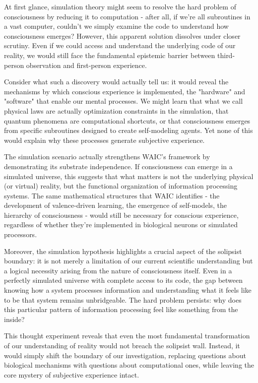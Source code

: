 At first glance, simulation theory might seem to resolve the hard problem of consciousness by reducing it to computation - after all, if we're all subroutines in a vast computer, couldn't we simply examine the code to understand how consciousness emerges? However, this apparent solution dissolves under closer scrutiny. Even if we could access and understand the underlying code of our reality, we would still face the fundamental epistemic barrier between third-person observation and first-person experience.

Consider what such a discovery would actually tell us: it would reveal the mechanisms by which conscious experience is implemented, the "hardware" and "software" that enable our mental processes. We might learn that what we call physical laws are actually optimization constraints in the simulation, that quantum phenomena are computational shortcuts, or that consciousness emerges from specific subroutines designed to create self-modeling agents. Yet none of this would explain why these processes generate subjective experience.

The simulation scenario actually strengthens WAIC's framework by demonstrating its substrate independence. If consciousness can emerge in a simulated universe, this suggests that what matters is not the underlying physical (or virtual) reality, but the functional organization of information processing systems. The same mathematical structures that WAIC identifies - the development of valence-driven learning, the emergence of self-models, the hierarchy of consciousness - would still be necessary for conscious experience, regardless of whether they're implemented in biological neurons or simulated processors.

Moreover, the simulation hypothesis highlights a crucial aspect of the solipsist boundary: it is not merely a limitation of our current scientific understanding but a logical necessity arising from the nature of consciousness itself. Even in a perfectly simulated universe with complete access to its code, the gap between knowing how a system processes information and understanding what it feels like to be that system remains unbridgeable. The hard problem persists: why does this particular pattern of information processing feel like something from the inside?

This thought experiment reveals that even the most fundamental transformation of our understanding of reality would not breach the solipsist wall. Instead, it would simply shift the boundary of our investigation, replacing questions about biological mechanisms with questions about computational ones, while leaving the core mystery of subjective experience intact.

